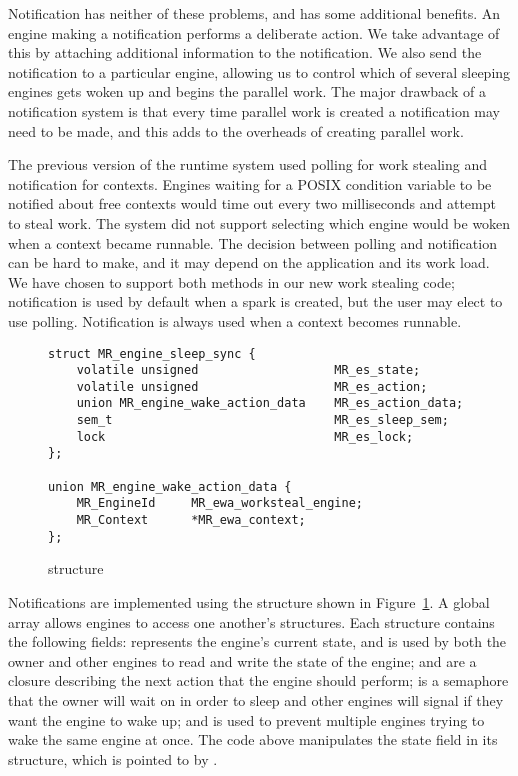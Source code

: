 Notification has neither of these problems, and has some additional
benefits.
An engine making a notification performs a deliberate action.
We take advantage of this by attaching additional information to the
notification.
We also send the notification to a particular engine,
allowing us to control which of several sleeping engines gets woken up and
begins the parallel work.
The major drawback of a notification system is that every time parallel work
is created a notification may need to be made,
and this adds to the overheads of creating parallel work.

The previous version of the runtime system used polling for work
stealing and notification for contexts.
Engines waiting for a POSIX condition variable to be notified about free
contexts would time out every two milliseconds and attempt to steal work.
The system did not support selecting which engine would be woken when a
context became runnable.
The decision between polling and notification can be hard to make,
and it may depend on the application and its work load.
We have chosen to support both methods in our new work stealing code;
notification is used by default when a spark is created,
but the user may elect to use polling.
Notification is always used when a context becomes runnable.

\begin{figure}
\begin{verbatim}
struct MR_engine_sleep_sync {
    volatile unsigned                   MR_es_state;
    volatile unsigned                   MR_es_action;
    union MR_engine_wake_action_data    MR_es_action_data;
    sem_t                               MR_es_sleep_sem;
    lock                                MR_es_lock;
};

union MR_engine_wake_action_data {
    MR_EngineId     MR_ewa_worksteal_engine;
    MR_Context      *MR_ewa_context;
};
\end{verbatim}
\caption{\enginesleepsync structure}
\label{fig:engine_sleep_sync}
\end{figure}

Notifications are implemented using the \enginesleepsync structure shown in
Figure~\ref{fig:engine_sleep_sync}.
A global array allows engines to access one another's \enginesleepsync
structures.
Each structure contains the following fields:
 represents the engine's current state,
and is used by both the owner and other engines to read and write the state
of the engine;
 and  are a closure describing
the next action that the engine should perform;
 is a semaphore that the owner will wait on in order to
sleep and other engines will signal if they want the engine to wake up;
and  is used to prevent multiple engines trying to wake the same
engine at once.
The \idle code above manipulates the state field in its structure,
which is pointed to by .

